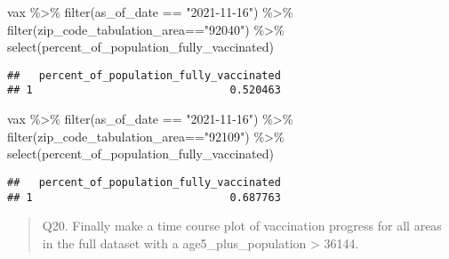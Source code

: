 \documentclass[
]{article}
\newenvironment{Shaded}{\begin{snugshade}}{\end{snugshade}}
\newcommand{\FunctionTok}[1]{\textcolor[rgb]{0.00,0.00,0.00}{#1}}
\newcommand{\NormalTok}[1]{#1}
\newcommand{\SpecialCharTok}[1]{\textcolor[rgb]{0.00,0.00,0.00}{#1}}
\newcommand{\StringTok}[1]{\textcolor[rgb]{0.31,0.60,0.02}{#1}}
\begin{document}
\begin{Shaded}
\begin{Highlighting}[]
\NormalTok{vax }\SpecialCharTok{\%\textgreater{}\%} \FunctionTok{filter}\NormalTok{(as\_of\_date }\SpecialCharTok{==} \StringTok{"2021{-}11{-}16"}\NormalTok{) }\SpecialCharTok{\%\textgreater{}\%}  
  \FunctionTok{filter}\NormalTok{(zip\_code\_tabulation\_area}\SpecialCharTok{==}\StringTok{"92040"}\NormalTok{) }\SpecialCharTok{\%\textgreater{}\%}
  \FunctionTok{select}\NormalTok{(percent\_of\_population\_fully\_vaccinated)}
\end{Highlighting}
\end{Shaded}

\begin{verbatim}
##   percent_of_population_fully_vaccinated
## 1                               0.520463
\end{verbatim}

\begin{Shaded}
\begin{Highlighting}[]
\NormalTok{vax }\SpecialCharTok{\%\textgreater{}\%} \FunctionTok{filter}\NormalTok{(as\_of\_date }\SpecialCharTok{==} \StringTok{"2021{-}11{-}16"}\NormalTok{) }\SpecialCharTok{\%\textgreater{}\%}  
  \FunctionTok{filter}\NormalTok{(zip\_code\_tabulation\_area}\SpecialCharTok{==}\StringTok{"92109"}\NormalTok{) }\SpecialCharTok{\%\textgreater{}\%}
  \FunctionTok{select}\NormalTok{(percent\_of\_population\_fully\_vaccinated)}
\end{Highlighting}
\end{Shaded}

\begin{verbatim}
##   percent_of_population_fully_vaccinated
## 1                               0.687763
\end{verbatim}

\begin{quote}
Q20. Finally make a time course plot of vaccination progress for all
areas in the full dataset with a age5\_plus\_population \textgreater{}
36144.
\end{quote}
\end{document}

